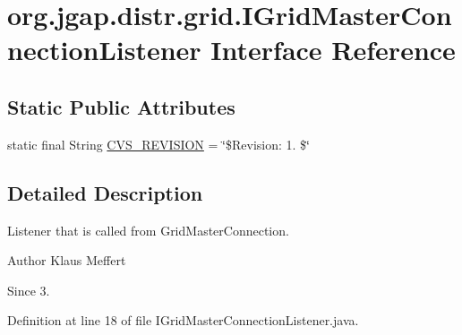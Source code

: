 \hypertarget{interfaceorg_1_1jgap_1_1distr_1_1grid_1_1_i_grid_master_connection_listener}{\section{org.\-jgap.\-distr.\-grid.\-I\-Grid\-Master\-Connection\-Listener Interface Reference}
\label{interfaceorg_1_1jgap_1_1distr_1_1grid_1_1_i_grid_master_connection_listener}
}
\subsection*{Static Public Attributes}
\begin{DoxyCompactItemize}
\item 
static final String \hyperlink{interfaceorg_1_1jgap_1_1distr_1_1grid_1_1_i_grid_master_connection_listener_ace8d9d4f96c0c8ea04a9531227d0e170}{C\-V\-S\-\_\-\-R\-E\-V\-I\-S\-I\-O\-N} = \char`\"{}\$Revision\-: 1. \$\char`\"{}
\end{DoxyCompactItemize}


\subsection{Detailed Description}
Listener that is called from Grid\-Master\-Connection.

\begin{DoxyAuthor}{Author}
Klaus Meffert 
\end{DoxyAuthor}
\begin{DoxySince}{Since}
3. 
\end{DoxySince}


Definition at line 18 of file I\-Grid\-Master\-Connection\-Listener.\-java.



